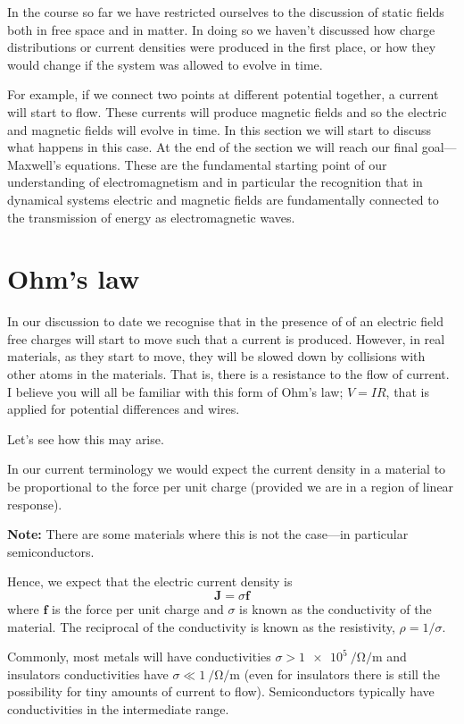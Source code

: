 \documentclass[12pt,chapterprefix=false,dvipsnames]{scrbook}
\theoremstyle{dotless}
\theoremstyle{definition}
\begin{document}
In the course so far we have restricted ourselves to the
discussion of static fields both in free space and in matter. In
doing so we haven't discussed how charge distributions or
current densities were produced in the first place, or how they
would change if the system was allowed to evolve in time.

For example, if we connect two points at different potential
together, a current will start to flow. These currents will
produce magnetic fields and so the electric and magnetic fields
will evolve in time. In this section we will start to discuss
what happens in this case. At the end of the section we will
reach our final goal---Maxwell's equations. These are the
fundamental starting point of our understanding of
electromagnetism and in particular the recognition that in
dynamical systems electric and magnetic fields are fundamentally
connected to the transmission of energy as electromagnetic
waves.

\section{Ohm's law}%
\label{sec:ohm_s_law}

In our discussion to date we recognise that in the presence of
of an electric field free charges will start to move such that a
current is produced. However, in real materials, as they start
to move, they will be slowed down by collisions with other atoms
in the materials. That is, there is a resistance to the flow of
current. I believe you will all be familiar with this form of
Ohm's law; $V = I R$, that is applied for
potential differences and wires.

Let's see how this may arise.

In our current terminology we would expect the current density
in a material to be proportional to the force per unit charge
(provided we are in a region of linear response).

\textbf{Note:} There are some materials where this is
not the case---in particular semiconductors.

Hence, we expect that the electric current density is
\begin{equation}
	\bm{J} = \sigma\bm{f}
\end{equation}
where $\bm{f}$ is the force per unit charge and
$\sigma$ is known as the conductivity of the
material. The reciprocal of the conductivity is known as the
resistivity, $\rho = 1/\sigma$.

Commonly, most metals will have conductivities
$\sigma > \SI{1e5}{\per\ohm\per\metre}$ and insulators conductivities have
$\sigma \ll \SI{1}{\per\ohm\per\metre}$ (even for insulators there is still the
possibility for tiny amounts of current to flow). Semiconductors
typically have conductivities in the intermediate range.
\end{document}
